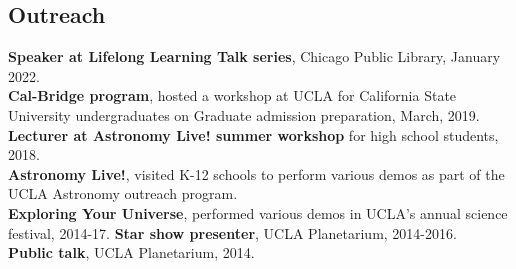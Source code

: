 \documentclass[margin, line]{res}
\begin{document}
\begin{resume}

%

%
%
%


\section{\sc Outreach}
{\bf Speaker at Lifelong Learning Talk series}, Chicago Public Library, January 2022. \\
{\bf Cal-Bridge program}, hosted a workshop at UCLA for California State University undergraduates on Graduate admission preparation, March, 2019. \\
{\bf Lecturer at Astronomy Live! summer workshop} for high school students, 2018. \\
{\bf Astronomy Live!}, visited K-12 schools to perform various demos as part of the UCLA Astronomy outreach program. \\
{\bf Exploring Your Universe}, performed various demos in UCLA's annual science festival, 2014-17.
{\bf Star show presenter}, UCLA Planetarium, 2014-2016. \\
{\bf Public talk}, UCLA Planetarium, 2014. \\



\end{resume}
\end{document}
